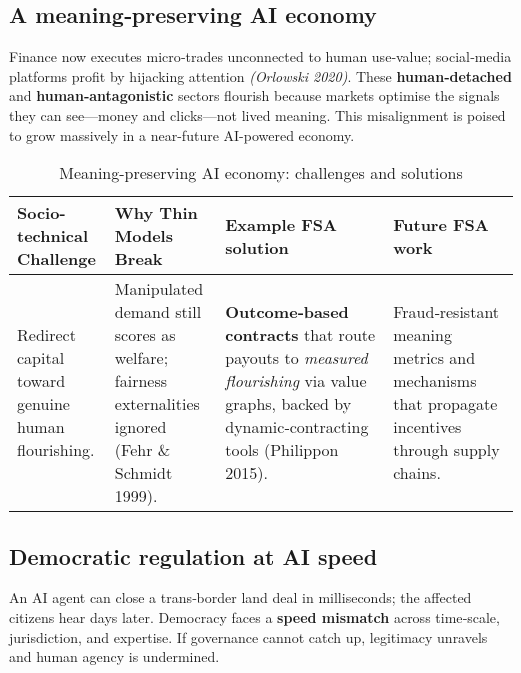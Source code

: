 \subsection{A meaning‑preserving AI economy}
Finance now executes micro‑trades unconnected to human use‑value; social‑media platforms profit by hijacking attention \textit{(Orlowski 2020)}. These \textbf{human‑detached} and \textbf{human‑antagonistic} sectors flourish because markets optimise the signals they can see—money and clicks—not lived meaning. This misalignment is poised to grow massively in a near-future AI-powered economy.

\begin{table*}[!htbp]
    \centering
    \small
    \begin{tabular}{p{}p{}p{}p{}}
        \toprule
        \textbf{Socio-technical Challenge} & \textbf{Why Thin Models Break} & \textbf{Example FSA solution} & \textbf{Future FSA work} \\
        \midrule
        Redirect capital toward genuine human flourishing. &
        Manipulated demand still scores as welfare; fairness externalities ignored (Fehr \& Schmidt 1999). &
        \textbf{Outcome‑based contracts} that route payouts to \textit{measured flourishing} via value graphs, backed by dynamic‑contracting tools (Philippon 2015). &
        Fraud‑resistant meaning metrics and mechanisms that propagate incentives through supply chains. \\
        \bottomrule
    \end{tabular}
    \caption{Meaning-preserving AI economy: challenges and solutions}
    \label{tab:meaning-economy}
\end{table*}

\subsection{Democratic regulation at AI speed}
An AI agent can close a trans‑border land deal in milliseconds; the affected citizens hear days later. Democracy faces a \textbf{speed mismatch} across time‑scale, jurisdiction, and expertise. If governance cannot catch up, legitimacy unravels and human agency is undermined.

